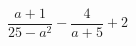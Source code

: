 \begin{ex}[type=expression]
	\begin{condition}
		\(\dfrac{a+1}{25-a^2}-\dfrac{4}{a+5}+2\)
	\end{condition}
\end{ex}